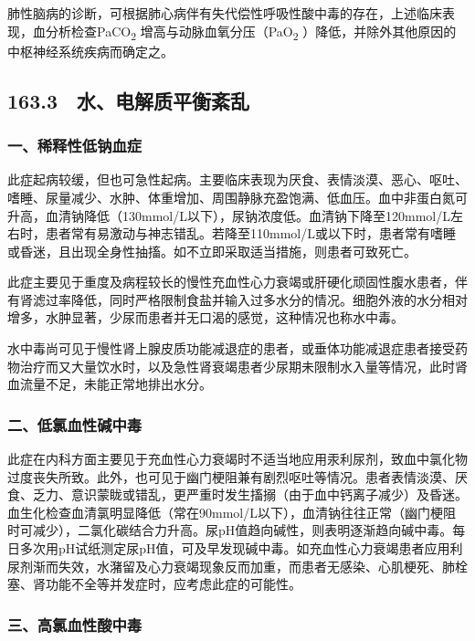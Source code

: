 肺性脑病的诊断，可根据肺心病伴有失代偿性呼吸性酸中毒的存在，上述临床表现，血分析检查PaCO\textsubscript{2}
增高与动脉血氧分压（PaO\textsubscript{2}
）降低，并除外其他原因的中枢神经系统疾病而确定之。

\protect\hypertarget{text00372.html}{}{}

\subsection{163.3　水、电解质平衡紊乱}

\subsubsection{一、稀释性低钠血症}

此症起病较缓，但也可急性起病。主要临床表现为厌食、表情淡漠、恶心、呕吐、嗜睡、尿量减少、水肿、体重增加、周围静脉充盈饱满、低血压。血中非蛋白氮可升高，血清钠降低（130mmol/L以下），尿钠浓度低。血清钠下降至120mmol/L左右时，患者常有易激动与神志错乱。若降至110mmol/L或以下时，患者常有嗜睡或昏迷，且出现全身性抽搐。如不立即采取适当措施，则患者可致死亡。

此症主要见于重度及病程较长的慢性充血性心力衰竭或肝硬化顽固性腹水患者，伴有肾滤过率降低，同时严格限制食盐并输入过多水分的情况。细胞外液的水分相对增多，水肿显著，少尿而患者并无口渴的感觉，这种情况也称水中毒。

水中毒尚可见于慢性肾上腺皮质功能减退症的患者，或垂体功能减退症患者接受药物治疗而又大量饮水时，以及急性肾衰竭患者少尿期未限制水入量等情况，此时肾血流量不足，未能正常地排出水分。

\subsubsection{二、低氯血性碱中毒}

此症在内科方面主要见于充血性心力衰竭时不适当地应用汞利尿剂，致血中氯化物过度丧失所致。此外，也可见于幽门梗阻兼有剧烈呕吐等情况。患者表情淡漠、厌食、乏力、意识蒙眬或错乱，更严重时发生搐搦（由于血中钙离子减少）及昏迷。血生化检查血清氯明显降低（常在90mmol/L以下），血清钠往往正常（幽门梗阻时可减少），二氯化碳结合力升高。尿pH值趋向碱性，则表明逐渐趋向碱中毒。每日多次用pH试纸测定尿pH值，可及早发现碱中毒。如充血性心力衰竭患者应用利尿剂渐而失效，水潴留及心力衰竭现象反而加重，而患者无感染、心肌梗死、肺栓塞、肾功能不全等并发症时，应考虑此症的可能性。

\subsubsection{三、高氯血性酸中毒}

